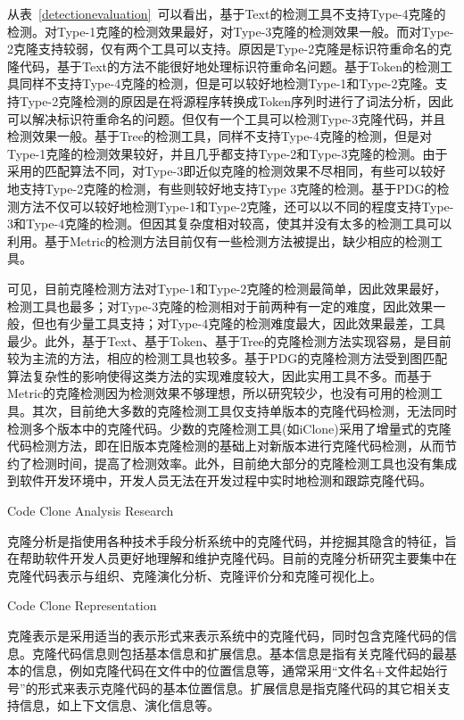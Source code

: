 从表~\ref{detectionevaluation}~可以看出，基于Text的检测工具不支持Type-4克隆的检测。对Type-1克隆的检测效果最好，对Type-3克隆的检测效果一般。而对Type-2克隆支持较弱，仅有两个工具可以支持。原因是Type-2克隆是标识符重命名的克隆代码，基于Text的方法不能很好地处理标识符重命名问题。基于Token的检测工具同样不支持Type-4克隆的检测，但是可以较好地检测Type-1和Type-2克隆。支持Type-2克隆检测的原因是在将源程序转换成Token序列时进行了词法分析，因此可以解决标识符重命名的问题。但仅有一个工具可以检测Type-3克隆代码，并且检测效果一般。基于Tree的检测工具，同样不支持Type-4克隆的检测，但是对Type-1克隆的检测效果较好，并且几乎都支持Type-2和Type-3克隆的检测。由于采用的匹配算法不同，对Type-3即近似克隆的检测效果不尽相同，有些可以较好地支持Type-2克隆的检测，有些则较好地支持Type 3克隆的检测。基于PDG的检测方法不仅可以较好地检测Type-1和Type-2克隆，还可以以不同的程度支持Type-3和Type-4克隆的检测。但因其复杂度相对较高，使其并没有太多的检测工具可以利用。基于Metric的检测方法目前仅有一些检测方法被提出\cite{kontogiannis1996pattern}\cite{mayrand1996experiment}，缺少相应的检测工具。

可见，目前克隆检测方法对Type-1和Type-2克隆的检测最简单，因此效果最好，检测工具也最多；对Type-3克隆的检测相对于前两种有一定的难度，因此效果一般，但也有少量工具支持；对Type-4克隆的检测难度最大，因此效果最差，工具最少。此外，基于Text、基于Token、基于Tree的克隆检测方法实现容易，是目前较为主流的方法，相应的检测工具也较多。基于PDG的克隆检测方法受到图匹配算法复杂性的影响使得这类方法的实现难度较大，因此实用工具不多。而基于Metric的克隆检测因为检测效果不够理想，所以研究较少，也没有可用的检测工具。其次，目前绝大多数的克隆检测工具仅支持单版本的克隆代码检测，无法同时检测多个版本中的克隆代码。少数的克隆检测工具(如iClone)采用了增量式的克隆代码检测方法，即在旧版本克隆检测的基础上对新版本进行克隆代码检测，从而节约了检测时间，提高了检测效率。此外，目前绝大部分的克隆检测工具也没有集成到软件开发环境中，开发人员无法在开发过程中实时地检测和跟踪克隆代码。

{Code Clone Analysis Research}

克隆分析是指使用各种技术手段分析系统中的克隆代码，并挖掘其隐含的特征，旨在帮助软件开发人员更好地理解和维护克隆代码。目前的克隆分析研究主要集中在克隆代码表示与组织、克隆演化分析、克隆评价分和克隆可视化上。

{Code Clone Representation}

克隆表示是采用适当的表示形式来表示系统中的克隆代码，同时包含克隆代码的信息。克隆代码信息则包括基本信息和扩展信息。基本信息是指有关克隆代码的最基本的信息，例如克隆代码在文件中的位置信息等，通常采用“文件名+文件起始行号”的形式来表示克隆代码的基本位置信息。扩展信息是指克隆代码的其它相关支持信息，如上下文信息、演化信息等。

